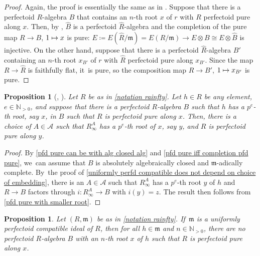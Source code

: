 \documentclass[JEP,XML,SOM,Unicode,published]{cedram}
\let\autoref\cref
\newcommand\mto{\mathchoice{\longmapsto}{\mapsto}{\mapsto}{\mapsto}}
\theoremstyle{plain}
\newtheorem{proposition}[theorem]{Proposition}
\theoremstyle{definition}
\numberwithin{equation}{theorem}
\let\tensor\otimes
\newcommand{\N}{\mathbb {N}}
\newcommand{\fram}{\mathfrak{m}}
\newcommand{\m}{\mathfrak{m}}
\newcommand{\sA}{\mathcal{A}}
\newcommand{\rafty}{R^A_\infty}
\begin{document}
\begin{proof}
Again, the proof is essentially the same as in \cite[Lem.\,4.8]{BMPSTWWPerfectoidPure}. Suppose that there is a perfectoid $R$\nobreakdash-algebra $B$ that contains an $n$-th root $x$ of $r$ with $R$ perfectoid pure along $x$. Then, by \cite[Prop.\,2.1.11\,(e)]{CesnaviciusScholzePurityFlatCohomology}, $\widehat{B}$ is a perfectoid $\widehat{R}$-algebra and the completion of the pure map $R\to B$, $1\mto x$ is pure: $E\coloneqq E(\widehat{R}/\fram)=E(R/\fram)\to E\tensor B \cong E\tensor \widehat{B}$ is injective. On the other hand, suppose that there is a perfectoid $\widehat{R}$-algebra $B'$ containing an $n$-th root $x_{B'}$ of $r$ with $\widehat{R}$ perfectoid pure along $x_{B'}$. Since the map $R\to \widehat{R}$ is faithfully flat, it~is pure, so the composition map $R\to B'$, $1\mto x_{B'}$ is pure.
\end{proof}

\begin{proposition}[, {\cite[Prop.\,2.9]{YoshikawaComputationMethodPerfectoidPurity}}]\label{pfd pure can take smaller algebra}
Let $R$ be as in \autoref{notation rainfty}. Let $h\in R$ be any element, $e\in \N_{>0}$, and suppose that there is a perfectoid $R$\nobreakdash-algebra $B$ such that $h$ has a $p^e$-th root, say $x$, in $B$ such that $R$ is perfectoid pure along $x$. Then, there is a choice of $A\in \sA$ such that $\rafty$ has a $p^e$-th root of $x$, say $y$, and $R$ is perfectoid pure along $y$.
\end{proposition}

\begin{proof}
By \autoref{pfd pure can be with alg closed alg} and \autoref{pfd pure iff completion pfd pure}, we~can assume that $B$ is absolutely algebraically closed and $\fram$-adically complete. By~the proof of \autoref{uniformly perfd compatible does not depend on choice of embedding}, there is an $A\in \sA$ such that $\rafty$ has a $p^e$-th root $y$ of $h$ and
$R\to B$ factors through $i\colon \rafty\to B$ with $i(y)=z$. The result then follows from \autoref{pfd pure with smaller root}.
\end{proof}

\begin{proposition}\label{max ideal unif compatible implies not pfd pure}
Let $(R,\fram)$ be as in \autoref{notation rainfty}. If~$\m$ is a uniformly perfectoid compatible ideal of $R$, then for all $h\in \fram$ and $n\in \N_{> 0}$, there are no perfectoid $R$\nobreakdash-algebra $B$ with an $n$-th root $x$ of $h$ such that $R$ is perfectoid pure along $x$.
\end{proposition}
\end{document}

